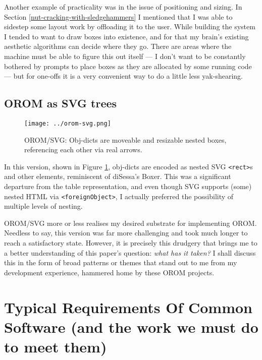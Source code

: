 Another example of practicality was in the issue of positioning and
sizing. In Section \ref{nut-cracking-with-sledgehammers} I mentioned
that I was able to sidestep some layout work by offloading it to the
user. While building the system I tended to want to draw boxes into
existence, and for that my brain's existing aesthetic algorithms can
decide where they go. There are areas where the machine must be able to
figure this out itself --- I don't want to be constantly bothered by
prompts to place boxes as they are allocated by some running code ---
but for one-offs it is a very convenient way to do a little less
yak-shearing.

\hypertarget{orom-as-svg-trees}{%
\subsection{OROM as SVG trees}\label{orom-as-svg-trees}}

\begin{figure}[h]
  \centering
  \texttt{[image: ../orom-svg.png]}
  \caption{OROM/SVG: Obj-dicts are moveable and resizable nested boxes,
           referencing each other via real arrows.\label{fig:orom-svg}}
\end{figure}

In this version, shown in Figure \ref{fig:orom-svg}, obj-dicts are
encoded as nested SVG \texttt{\textless{}rect\textgreater{}}s and other
elements, reminiscent of diSessa's Boxer. This was a significant
departure from the table representation, and even though SVG supports
(some) nested HTML via \texttt{\textless{}foreignObject\textgreater{}},
I actually preferred the possibility of multiple levels of nesting.

OROM/SVG more or less realises my desired substrate for implementing
OROM. Needless to say, this version was far more challenging and took
much longer to reach a satisfactory state. However, it is precisely this
drudgery that brings me to a better understanding of this paper's
question: \emph{what has it taken?} I shall discuss this in the form of
broad patterns or themes that stand out to me from my development
experience, hammered home by these OROM projects.

\hypertarget{typical-requirements-of-common-software-and-the-work-we-must-do-to-meet-them}{%
\section{Typical Requirements Of Common Software (and the work we must
do to meet
them)}\label{typical-requirements-of-common-software-and-the-work-we-must-do-to-meet-them}}

